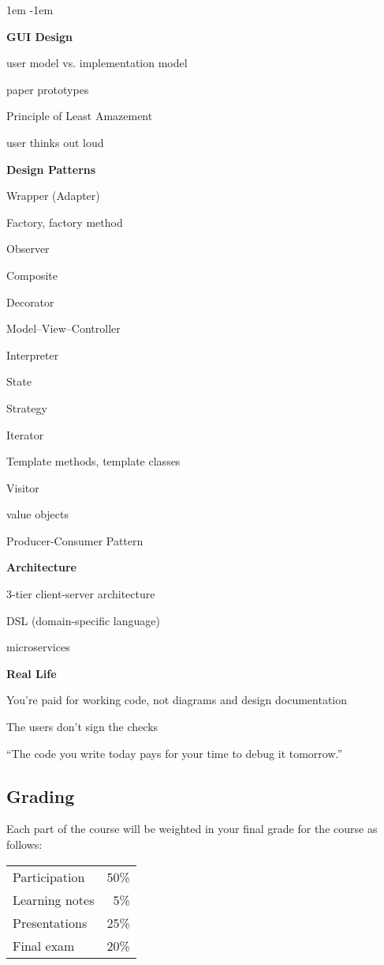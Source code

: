 \documentclass[12pt]{article}
\newenvironment{col3}
  {\begin{minipage}[t]{0.3\textwidth}
   \fontsize{10}{12}\selectfont
   \raggedright
   \leftskip 1em
   \parindent -1em}
  {\end{minipage}}
\newcommand{\hd}[1]{\vspace{\baselineskip}\textbf{#1}\vspace{0.1em}}
\begin{document}
\begin{col3}

\hd{GUI Design}

user model vs. implementation model

paper prototypes

Principle of Least Amazement

user thinks out loud



\hd{Design Patterns}

Wrapper (Adapter)

Factory, factory method

Observer

Composite

Decorator

Model–View–Controller

Interpreter

State

Strategy

Iterator

Template methods, template classes

Visitor

value objects

Producer-Consumer Pattern


\hd{Architecture}

3-tier client-server architecture

DSL (domain-specific language)

microservices


\hd{Real Life}

You're paid for working code, not diagrams and design documentation

The users don't sign the checks

``The code you write today pays for your time to debug it tomorrow.''
\end{col3}

\pagebreak
\subsection*{Grading}

Each part of the course will be weighted in your final grade for the course as
follows:

\begin{adjustwidth}{3em}{}
\begin{NiceTabular}{lr}
Participation & 50\% \\
Learning notes & 5\% \\
Presentations & 25\% \\
Final exam & 20\% \\
\end{NiceTabular}
\end{adjustwidth}
\end{document}
